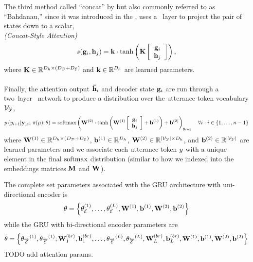 The third method called ``concat'' by \citet{luong2015} but also commonly
referred to as ``Bahdanau,'' since it was introduced in the 
\citet{bahdanau2015}, uses a \feedforward~layer to project the pair of states
down to a scalar,\\
\textit{(Concat-Style Attention)}
\[ s(\mathbf{g}_i, \mathbf{h}_j) = \mathbf{k}\cdot\tanh\left(\mathbf{K}\left[ \begin{array}{c} \mathbf{g}_i \\ \mathbf{h}_j \end{array} \right] \right),  \]
    where $\mathbf{K} \in \mathbb{R}^{D_{h} \times ({D_\mathcal{D}} + {D_\mathcal{E}})}$
    and $\mathbf{k} \in \mathbb{R}^{D_{h}}$ are learned parameters.



\paragraph{}
Finally, the attention output ${\boldsymbol{\bar{\mathbf{h}}}}_i$ and decoder state $\mathbf{g}_i$
are run through a two~layer \feedforward~network to produce a distribution
over the utterance token vocabulary $\mathcal{V}_{\mathcal{Y}}$,
\[ p\left(y_{i+1}|\mathbf{y}_{1:i},\pi(\mu);\theta\right) = \operatorname*{softmax}\left(   \mathbf{W}^{(2)}\cdot \tanh\left(\mathbf{W}^{(1)} \left[ \begin{array}{c}\mathbf{g}_i \\ \mathbf{h}_j \end{array} \right] + \mathbf{b}^{(1)}\right) + \mathbf{b}^{(2)} \right)_{y_{i+1}}\quad \forall i: i \in \{1,\ldots,n-1\} \]
    where $\mathbf{W}^{(1)} \in \mathbb{R}^{D_{h} \times \left({D_\mathcal{D}} + {D_\mathcal{E}}\right)}$,
    $\mathbf{b}^{(1)} \in \mathbb{R}^{D_{h}}$, $\mathbf{W}^{(2)} \in \mathbb{R}^{{\left\vert \mathcal{V}_{\mathcal{Y}} \right\vert} \times D_{h}}$, and $\mathbf{b}^{(2)}\in\mathbb{R}^{{\left\vert \mathcal{V}_{\mathcal{Y}} \right\vert}}$ are learned
    parameters and we associate each utterance token $y$ with a unique 
    element in the final $\operatorname*{softmax}$ distribution (similar to how we indexed
    into the embeddings matrices $\mathbf{M}$ and $\mathbf{W}$). 



    The complete set parameters associated with the GRU architecture 
    with uni-directional encoder is
    \[ \theta = \left\{ \theta_\mathcal{E}^{(1)},
    \ldots, \theta_\mathcal{E}^{(L)}, 
    \mathbf{W}^{(1)}, \mathbf{b}^{(1)}, \mathbf{W}^{(2)}, \mathbf{b}^{(2)}
    \right\}  \]
    while the GRU
    with bi-directional encoder parameters are
    \[ \theta = \left\{ {\theta_{\overrightarrow{\mathcal{E}}}}^{(1)}, {\theta_{\overleftarrow{\mathcal{E}}}}^{(1)},
            \mathbf{W}^{(br)}_1, \mathbf{b}^{(br)}_1,
    \ldots, {\theta_{\overrightarrow{\mathcal{E}}}}^{(L)}, {\theta_{\overleftarrow{\mathcal{E}}}}^{(L)},
    \mathbf{W}^{(br)}_{L}, \mathbf{b}^{(br)}_{L}, \mathbf{W}^{(1)}, \mathbf{b}^{(1)}, \mathbf{W}^{(2)}, \mathbf{b}^{(2)}
    \right\}  \]
    TODO add attention params.
    


